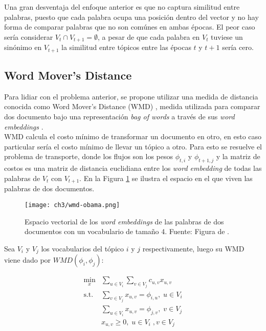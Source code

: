 Una gran desventaja del enfoque anterior es que no captura similitud entre palabras, puesto que cada palabra ocupa una posición dentro del vector y no hay forma de comparar palabras que no son comúnes en ambas épocas. El peor caso sería considerar $V_{t}\cap V_{t+1} =  \emptyset$, a pesar de que cada palabra en $V_{t}$ tuviese un sinónimo en $V_{t+1}$ la similitud entre tópicos entre las épocas $t$ y $t+1$ sería cero.\\

\subsection{Word Mover's Distance}

Para lidiar con el problema anterior, se propone utilizar una medida de distancia conocida como Word Mover's Distance (WMD) \citep{kusner2015word}, medida utilizada para comparar dos documento bajo una representación \textit{bag of words} a través de sus \textit{word embeddings} \citep{mikolov2013distributed}.\\

WMD calcula el costo mínimo de transformar un documento en otro, en esto caso particular sería el costo mínimo de llevar un tópico a otro. Para esto se resuelve el problema de transporte, donde los flujos son los pesos $\phi_{t,i}$ y $\phi_{t+1,j}$ y la matriz de costos es una matriz de distancia euclidiana entre los \textit{word embedding} de todas las palabras de $V_{t}$ con $V_{t+1}$. En la Figura \ref{img:wmd_obama} se ilustra el espacio en el que viven las palabras de dos documentos.

\begin{figure}
    \centering
    \texttt{[image: ch3/wmd-obama.png]}
    \caption{Espacio vectorial de los \textit{word embeddings} de las palabras de dos documentos con un vocabulario de tamaño 4. Fuente: Figura de \citep{WMDPy}.}
    \label{img:wmd_obama}
\end{figure}

Sea  $V_{i}$ y $V_{j}$ los vocabularios del tópico $i$ y $j$ respectivamente, luego su WMD viene dado por $WMD(\phi_{i}, \phi_{j})$:

\begin{align}
\underset{x}{\text{min}}&\sum_{u \in V_{i}}\sum_{v \in V_{j}} c_{u,v}x_{u,v} \\ 
\textrm{s.t.} &\sum_{v \in V_{j}}x_{u,v}= \phi_{i,u}, \; u \in V_{i}\\ 
& \sum_{u \in V_{i}}x_{u,v}= \phi_{j,v}, \; v\in V_{j}\\
& x_{u,v} \geq 0,\; u \in V_{i} \;, v \in V_{j}\\ \nonumber
\end{align}

